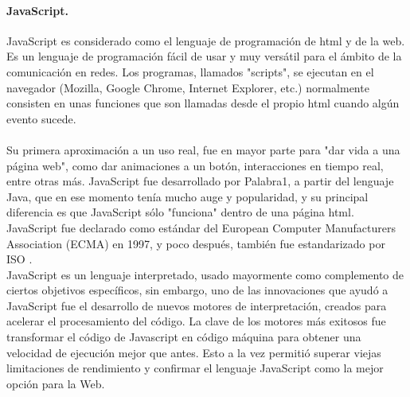 \documentclass[12pt, a4paper, titlepage]{report}
\begin{document}
			\paragraph {JavaScript. \\}
			JavaScript es considerado como el lenguaje de programación de html y de la web. Es un lenguaje de programación fácil de usar y muy versátil para el ámbito de la comunicación en redes. Los programas, llamados "scripts", se ejecutan en el navegador (Mozilla, Google Chrome, Internet Explorer, etc.) normalmente consisten en unas funciones que son llamadas desde el propio html cuando algún evento sucede.\\\\
			Su primera aproximación a un uso real, fue en mayor parte para "dar vida a una página web", como dar animaciones a un botón, interacciones en tiempo real, entre otras más. 
			JavaScript fue desarrollado por \Gls{Palabra1}, a partir del lenguaje Java, que en ese momento tenía mucho auge y popularidad, y su principal diferencia es que JavaScript sólo "funciona" dentro de una página html.\\
			JavaScript fue declarado como estándar del European Computer Manufacturers Association (ECMA) en 1997, y poco después, también fue estandarizado por ISO \cite{refJavaScript}. \\ 
			JavaScript es un lenguaje interpretado, usado mayormente como complemento de ciertos objetivos específicos, sin embargo, uno de las innovaciones que ayudó a JavaScript fue el desarrollo de nuevos motores de interpretación, creados para acelerar el procesamiento del código. La clave de los motores más exitosos fue transformar el código de Javascript en código máquina para obtener una velocidad de ejecución mejor que antes. Esto a la vez permitió superar viejas limitaciones de rendimiento y confirmar el lenguaje JavaScript como la mejor opción para la Web.\\
			
\end{document}
